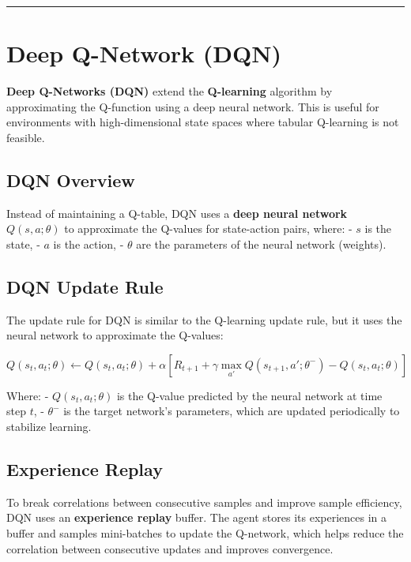\documentclass[
]{book}
\begin{document}
\begin{center}\rule{0.5\linewidth}{0.5pt}\end{center}

\section{Deep Q-Network (DQN)}\label{deep-q-network-dqn}

\textbf{Deep Q-Networks (DQN)} extend the \textbf{Q-learning} algorithm by approximating the Q-function using a deep neural network. This is useful for environments with high-dimensional state spaces where tabular Q-learning is not feasible.

\subsection{DQN Overview}\label{dqn-overview}

Instead of maintaining a Q-table, DQN uses a \textbf{deep neural network} \(Q(s, a; \theta)\) to approximate the Q-values for state-action pairs, where:
- \(s\) is the state,
- \(a\) is the action,
- \(\theta\) are the parameters of the neural network (weights).

\subsection{DQN Update Rule}\label{dqn-update-rule}

The update rule for DQN is similar to the Q-learning update rule, but it uses the neural network to approximate the Q-values:

\[
Q(s_t, a_t; \theta) \leftarrow Q(s_t, a_t; \theta) + \alpha \left[ R_{t+1} + \gamma \max_{a'} Q(s_{t+1}, a'; \theta^-) - Q(s_t, a_t; \theta) \right]
\]

Where:
- \(Q(s_t, a_t; \theta)\) is the Q-value predicted by the neural network at time step \(t\),
- \(\theta^-\) is the target network's parameters, which are updated periodically to stabilize learning.

\subsection{Experience Replay}\label{experience-replay}

To break correlations between consecutive samples and improve sample efficiency, DQN uses an \textbf{experience replay} buffer. The agent stores its experiences in a buffer and samples mini-batches to update the Q-network, which helps reduce the correlation between consecutive updates and improves convergence.
\end{document}
